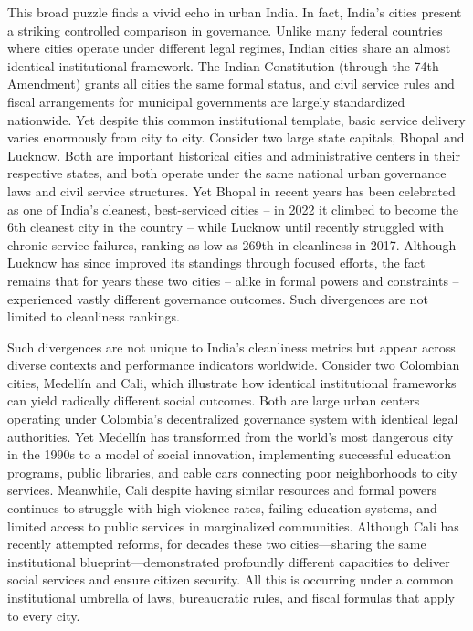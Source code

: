 This broad puzzle finds a vivid echo in urban India. In fact, India’s cities present a striking controlled comparison in governance. Unlike many federal countries where cities operate under different legal regimes, Indian cities share an almost identical institutional framework. The Indian Constitution (through the 74th Amendment) grants all cities the same formal status, and civil service rules and fiscal arrangements for municipal governments are largely standardized nationwide. Yet despite this common institutional template, basic service delivery varies enormously from city to city. Consider two large state capitals, Bhopal and Lucknow. Both are important historical cities and administrative centers in their respective states, and both operate under the same national urban governance laws and civil service structures. Yet Bhopal in recent years has been celebrated as one of India’s cleanest, best-serviced cities – in 2022 it climbed to become the 6th cleanest city in the country – while Lucknow until recently struggled with chronic service failures, ranking as low as 269th in cleanliness in 2017.  Although Lucknow has since improved its standings through focused efforts, the fact remains that for years these two cities – alike in formal powers and constraints – experienced vastly different governance outcomes. Such divergences are not limited to cleanliness rankings. 

Such divergences are not unique to India's cleanliness metrics but appear across diverse contexts and performance indicators worldwide. Consider two Colombian cities, Medellín and Cali, which illustrate how identical institutional frameworks can yield radically different social outcomes. Both are large urban centers operating under Colombia's decentralized governance system with identical legal authorities. Yet Medellín has transformed from the world's most dangerous city in the 1990s to a model of social innovation, implementing successful education programs, public libraries, and cable cars connecting poor neighborhoods to city services. Meanwhile, Cali despite having similar resources and formal powers continues to struggle with high violence rates, failing education systems, and limited access to public services in marginalized communities. Although Cali has recently attempted reforms, for decades these two cities—sharing the same institutional blueprint—demonstrated profoundly different capacities to deliver social services and ensure citizen security. All this is occurring under a common institutional umbrella of laws, bureaucratic rules, and fiscal formulas that apply to every city. 

